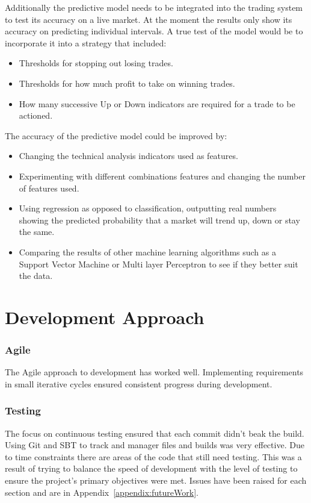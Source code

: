 	Additionally the predictive model needs to be integrated into the trading system to test its accuracy on a live market. At the moment the results only show its accuracy on predicting individual intervals. A true test of the model would be to incorporate it into a strategy that included:
	\begin{itemize}
		\item Thresholds for stopping out losing trades.
		\item Thresholds for how much profit to take on winning trades.
		\item How many successive Up or Down indicators are required for a trade to be actioned.
	\end{itemize}
	The accuracy of the predictive model could be improved by:
	\begin{itemize}
		\item Changing the technical analysis indicators used as features.
		\item Experimenting with different combinations features and changing the number of features used.
		\item Using regression as opposed to classification, outputting real numbers showing the predicted probability that a market will trend up, down or stay the same.
		\item Comparing the results of other machine learning algorithms such as a Support Vector Machine or Multi layer Perceptron to see if they better suit the data.
	\end{itemize}
		
	\section{Development Approach}
	\subsubsection{Agile}
	The Agile approach to development has worked well. Implementing requirements in small iterative cycles ensured consistent progress during development.
	
	\subsubsection{Testing}
	The focus on continuous testing ensured that each commit didn't beak the build. Using Git and SBT to track and manager files and builds was very effective. Due to time constraints there are areas of the code that still need testing. This was a result of trying to balance the speed of development with the level of testing to ensure the project's primary objectives were met. Issues have been raised for each section and are in Appendix~\ref{appendix:futureWork}.\\
	